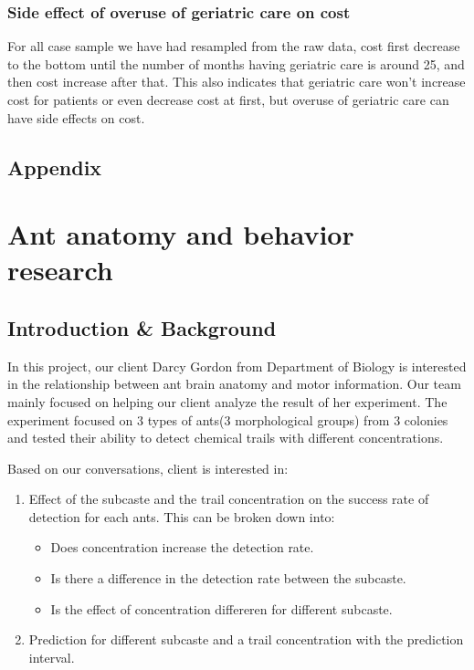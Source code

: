 \documentclass{article}
\begin{document}
	\subsubsection{Side effect of overuse of geriatric care on cost}	
	For all case sample we have had resampled from the raw data, cost first decrease to the bottom until the number of months having geriatric care is around 25, and then cost increase after that. This also indicates that geriatric care won’t increase cost for patients or even decrease cost at first, but overuse of geriatric care can have side effects on cost.
	\subsection{Appendix}

	\section{Ant anatomy and behavior research}
	\subsection{Introduction \& Background}
	In this project, our client Darcy Gordon from Department of Biology is interested in the relationship between ant brain anatomy and motor information. Our team mainly focused on helping our client analyze the result of her experiment. The experiment focused on 3 types of ants(3 morphological groups) from 3 colonies and tested their ability to detect chemical trails with different concentrations. 

	Based on our conversations, client is interested in:
	\begin{enumerate}
		\item Effect of the subcaste and the trail concentration on the success rate of detection for each ants. This can be broken down into:
		\begin{itemize}
			\item Does concentration increase the detection rate.
			\item Is there a difference in the detection rate between the subcaste.
			\item Is the effect of concentration differeren for different subcaste.
		\end{itemize}
		\item Prediction for different subcaste and a trail concentration with the prediction interval.
	\end{enumerate}
	
\end{document}
